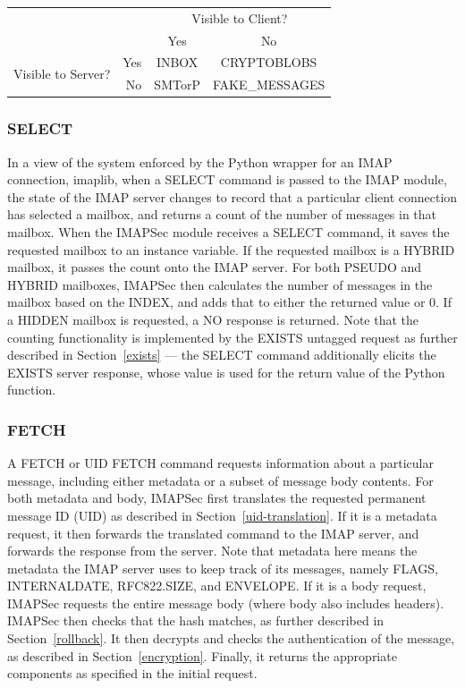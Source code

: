 \documentclass[pageno]{jpaper}
\newcommand{\project}{IMAPSec }
\begin{document}
\begin{tabular}{ rr|c|c| }

 &\multicolumn{1}{r}{} & \multicolumn{2}{c}{Visible to Client?} \\

&\multicolumn{1}{r}{}
 &  \multicolumn{1}{c}{Yes}
 & \multicolumn{1}{c}{No} \\
\cline{3-4}
\multirow{2}{*}{Visible to Server?} & Yes & INBOX & CRYPTOBLOBS \\
\cline{3-4}
& No & SMTorP & FAKE\_MESSAGES \\
\cline{3-4}
\end{tabular}

\subsubsection{SELECT}
\label{select}

In a view of the system enforced by the Python wrapper for an IMAP connection, imaplib, when a SELECT command is passed to the IMAP module, the state of the IMAP server changes to record that a particular client connection has selected a mailbox, and returns a count of the number of messages in that mailbox. When the \project module receives a SELECT command, it saves the requested mailbox to an instance variable. If the requested mailbox is a HYBRID mailbox, it passes the count onto the IMAP server. For both PSEUDO and HYBRID mailboxes, \project then calculates the number of messages in the mailbox based on the INDEX, and adds that to either the returned value or 0. If a HIDDEN mailbox is requested, a NO response is returned. Note that the counting functionality is implemented by the EXISTS untagged request as further described in Section~\ref{exists} \---- the SELECT command additionally elicits the EXISTS server response, whose value is used for the return value of the Python function.

\subsubsection{FETCH} A FETCH or UID FETCH command requests information about a particular message, including either metadata or a subset of message body contents. For both metadata and body, \project first translates the requested permanent message ID (UID) as described in Section~\ref{uid-translation}. If it is a metadata request, it then forwards the translated command to the IMAP server, and forwards the response from the server. Note that metadata here means the metadata the IMAP server uses to keep track of its messages, namely FLAGS, INTERNALDATE, RFC822.SIZE, and ENVELOPE. If it is a body request, \project requests the entire message body (where body also includes headers). \project then checks that the hash matches, as further described in Section~\ref{rollback}. It then decrypts and checks the authentication of the message, as described in Section~\ref{encryption}. Finally, it returns the appropriate components as specified in the initial request.
\end{document}
